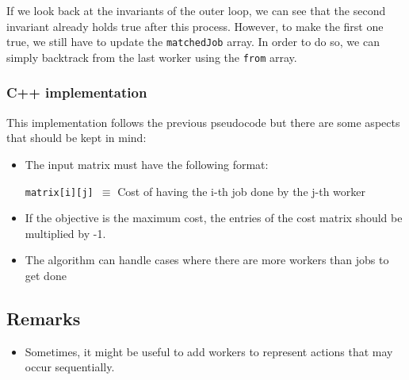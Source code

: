 If we look back at the invariants of the outer loop, we can see that the second
invariant already holds true after this process. However, to make the first one
true, we still have to update the \texttt{matchedJob} array. In order to do so,
we can simply backtrack from the last worker using the \texttt{from} array.
\subsubsection{C++ implementation}
This implementation follows the previous pseudocode but there are some aspects
that should be kept in mind:
\begin{itemize}
		\setlength{\itemsep}{0pt}
		\item The input matrix must have the following format:
				\begin{center}
						\texttt{matrix[i][j] $\equiv$} Cost of having the 
						i-th job done by the j-th worker
				\end{center}
		\item If the objective is the maximum cost, the entries of 
				the cost matrix should be multiplied by -1.
		\item The algorithm can handle cases where there are more workers than 
				jobs to get done
\end{itemize}

\subsection*{Remarks}
\begin{itemize}
		\item Sometimes, it might be useful to add workers to represent actions
				that may occur sequentially.
\end{itemize}









